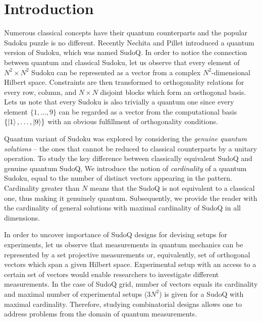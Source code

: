 \documentclass[aps,onecolumn,floatfix,superscriptaddress]{revtex4}
\begin{document}
\maketitle

\section{Introduction}
Numerous classical concepts have their quantum counterparts and the popular Sudoku puzzle is no different. Recently Nechita and Pillet \cite{Nechita2020SudoQA} introduced a quantum version of Sudoku, which was named SudoQ. In order to notice the connection between quantum and classical Sudoku, let us observe that every element of $N^{2}\times N^{2}$ Sudoku can be represented as a vector from a complex $N^{2}$-dimensional Hilbert space. Constraints are then transformed to orthogonality relations for every row, column, and $N \times N$ disjoint blocks which form an orthogonal basis. Lets us note that every Sudoku is also trivially a quantum one since every element $\{1, ..., 9\}$ can be regarded as a vector from the computational basis $\{ \ket{1}, \ldots , \ket{9}\}$ with an obvious fulfillment of orthogonality conditions.

Quantum variant of Sudoku was explored by considering the \emph{genuine quantum solutions} – the ones that cannot be reduced to classical counterparts by a unitary operation. 
To study the key difference between classically equivalent SudoQ and genuine quantum SudoQ, We introduce the notion of \emph{cardinality} of a quantum Sudoku, equal to the number of distinct vectors appearing in the pattern. Cardinality greater than $N$ means that the SudoQ is not equivalent to a classical one, thus making it genuinely quantum. Subsequently, we provide the reader with the cardinality of general solutions with maximal cardinality of SudoQ in all dimensions. 

In order to uncover importance of SudoQ designs for devising setups for experiments, let us observe that measurements in quantum mechanics can be represented by a set projective measurements or, equivalently, set of orthogonal vectors which span a given Hilbert space.
Experimental setup with an access to a certain set of vectors would enable researchers to investigate different measurements.
In the case of SudoQ grid, number of vectors equals its cardinality and maximal number of experimental setups ($3N^2$) is given for a SudoQ with maximal cardinality.
Therefore, studying combinatorial designs allows one to address problems from the domain of quantum measurements. 
\end{document}
